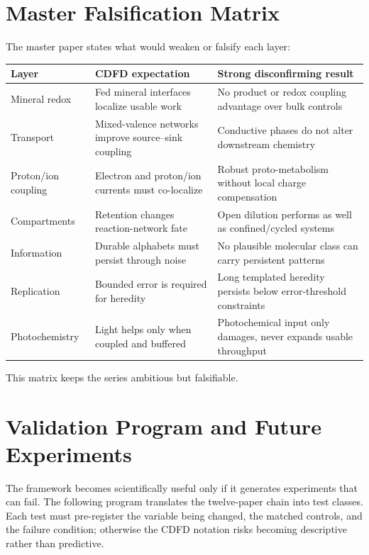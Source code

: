 \documentclass[11pt,a4paper]{article}
\begin{document}
\section{Master Falsification Matrix}
The master paper states what would weaken or falsify each layer:
\begin{center}
\small
\begin{tabular}{p{}p{}p{}}
\toprule
Layer & CDFD expectation & Strong disconfirming result \\
\midrule
Mineral redox & Fed mineral interfaces localize usable work & No product or redox coupling advantage over bulk controls \\
Transport & Mixed-valence networks improve source--sink coupling & Conductive phases do not alter downstream chemistry \\
Proton/ion coupling & Electron and proton/ion currents must co-localize & Robust proto-metabolism without local charge compensation \\
Compartments & Retention changes reaction-network fate & Open dilution performs as well as confined/cycled systems \\
Information & Durable alphabets must persist through noise & No plausible molecular class can carry persistent patterns \\
Replication & Bounded error is required for heredity & Long templated heredity persists below error-threshold constraints \\
Photochemistry & Light helps only when coupled and buffered & Photochemical input only damages, never expands usable throughput \\
\bottomrule
\end{tabular}
\end{center}
This matrix keeps the series ambitious but falsifiable.

\section{Validation Program and Future Experiments}
The framework becomes scientifically useful only if it generates experiments that can fail. The following program translates the twelve-paper chain into test classes. Each test must pre-register the variable being changed, the matched controls, and the failure condition; otherwise the CDFD notation risks becoming descriptive rather than predictive.
\end{document}
